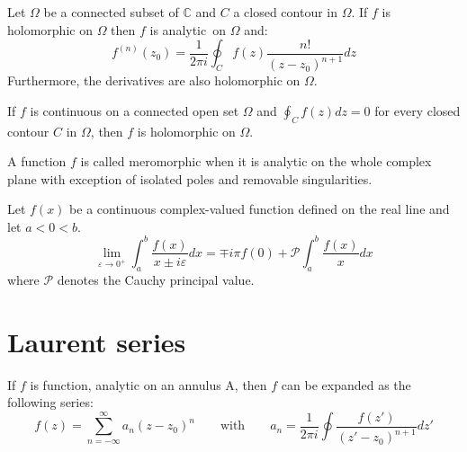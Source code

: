        \begin{result}
		Let $\Omega$ be a connected subset of $\mathbb{C}$ and $C$ a closed contour in $\Omega$. If $f$ is holomorphic on $\Omega$ then $f$ is analytic\footnotemark\ on $\Omega$ and:
	        \begin{equation}
			\label{complexcalculus:cauchy_integral_formula_derivative}
	                \boxed{f^{(n)}(z_0) = \frac{1}{2\pi i}\oint_C f(z) \frac{n!}{(z - z_0)^{n+1}} dz}
		\end{equation}
	        Furthermore, the derivatives are also holomorphic on $\Omega$.
	\end{result}
        
        \begin{theorem}
	        If $f$ is continuous on a connected open set $\Omega$ and $\oint_C f(z) dz = 0$ for every closed contour $C$ in $\Omega$, then $f$ is holomorphic on $\Omega$.
	\end{theorem}
        
        \begin{definition}[Meromorphic]
		A function $f$ is called meromorphic when it is analytic on the whole complex plane with exception of isolated poles and removable singularities.
	\end{definition}

	\begin{theorem}
		Let $f(x)$ be a continuous complex-valued function defined on the real line and let $a<0<b$.
		\begin{equation}
			\lim_{\varepsilon\rightarrow0^+}\int_a^b\frac{f(x)}{x\pm i\varepsilon}dx = \mp i\pi f(0) + \mathcal{P}\int_a^b\frac{f(x)}{x}dx
		\end{equation}
		where $\mathcal{P}$ denotes the Cauchy principal value.
	\end{theorem}
        
\section{Laurent series}
    	
    	\begin{definition}\label{complexcalculus:laurent_series}
        	If $f$ is function, analytic on an annulus A, then $f$ can be expanded as the following series:
        	\begin{equation}
        	        f(z) = \sum^{\infty}_{n=-\infty} a_n (z - z_0)^n \qquad \text{with} \qquad a_n = \frac{1}{2\pi i} \oint \frac{f(z')}{(z' - z_0)^{n+1}} dz'
		\end{equation}
	\end{definition}
        
